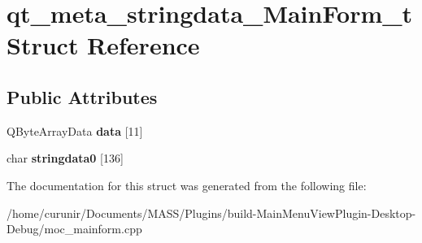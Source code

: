 \hypertarget{structqt__meta__stringdata___main_form__t}{}\section{qt\+\_\+meta\+\_\+stringdata\+\_\+\+Main\+Form\+\_\+t Struct Reference}
\label{structqt__meta__stringdata___main_form__t}
\subsection*{Public Attributes}
\begin{DoxyCompactItemize}
\item 
Q\+Byte\+Array\+Data {\bfseries data} \mbox{[}11\mbox{]}\hypertarget{structqt__meta__stringdata___main_form__t_a9605f0952179062a9c5b5d21245fe49c}{}\label{structqt__meta__stringdata___main_form__t_a9605f0952179062a9c5b5d21245fe49c}

\item 
char {\bfseries stringdata0} \mbox{[}136\mbox{]}\hypertarget{structqt__meta__stringdata___main_form__t_a8d7418fdcaa60bb4916948133fd4eedb}{}\label{structqt__meta__stringdata___main_form__t_a8d7418fdcaa60bb4916948133fd4eedb}

\end{DoxyCompactItemize}


The documentation for this struct was generated from the following file\+:\begin{DoxyCompactItemize}
\item 
/home/curunir/\+Documents/\+M\+A\+S\+S/\+Plugins/build-\/\+Main\+Menu\+View\+Plugin-\/\+Desktop-\/\+Debug/moc\+\_\+mainform.\+cpp\end{DoxyCompactItemize}
